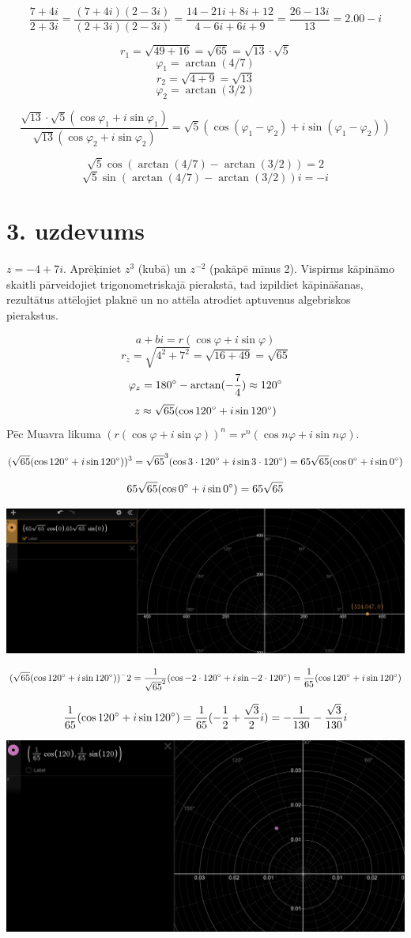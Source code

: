 \documentclass{article}
\begin{document}
$$\frac{7+4i}{2+3i} = \frac{(7+4i)(2-3i)}{(2+3i)(2-3i)} = \frac{14-21i+8i+12}{4-6i+6i+9} = \frac{26-13i}{13} = 2.00-i$$

$$r_1 = \sqrt{49+16} = \sqrt{65}=\sqrt{13}\cdot\sqrt{5}$$
$$\varphi_1 = \arctan{(4/7)}$$
$$r_2 = \sqrt{4+9} = \sqrt{13}$$
$$\varphi_2 = \arctan{(3/2)}$$

$$\frac{\sqrt{13}\cdot\sqrt{5}(\cos\varphi_1+i\sin\varphi_1)}{\sqrt{13}(\cos\varphi_2+i\sin\varphi_2)} = \sqrt{5}(\cos(\varphi_1-\varphi_2)+i\sin(\varphi_1-\varphi_2))$$

$$\sqrt{5}\cos(\arctan(4/7)-\arctan(3/2)) = 2$$
$$\sqrt{5}\sin(\arctan(4/7)-\arctan(3/2))i = -i$$

\section*{3. uzdevums}
$z=-4+7i$. Aprēķiniet $z^3$ (kubā) un $z^{-2}$ (pakāpē mīnus 2). Vispirms kāpināmo skaitli pārveidojiet trigonometriskajā pierakstā, tad izpildiet kāpināšanas, rezultātus attēlojiet plaknē un no attēla atrodiet aptuvenus algebriskos pierakstus.

$$a+bi = r(\cos\varphi+i\sin\varphi)$$
$$ r_z = \sqrt{4^2+7^2} =  \sqrt{16+49} = \sqrt{65}$$
$$ \varphi_z = 180\degree - \arctan(-\frac{7}{4}) \approx 120\degree$$
$$z \approx\sqrt{65}(\cos120\degree+i\sin120\degree)$$
Pēc Muavra likuma $(r(\cos \varphi + i \sin \varphi))^n=r^n(\cos n\varphi + i \sin n\varphi)$.

$$(\sqrt{65}(\cos120\degree+i\sin120\degree))^3 = \sqrt{65}^3(\cos3\cdot120\degree+i\sin3\cdot120\degree)= 65\sqrt{65}(\cos0\degree + i\sin0\degree)$$

$$65\sqrt{65}(\cos0\degree + i\sin0\degree)=65\sqrt{65}$$

\includegraphics[width=\textwidth]{2}

$$(\sqrt{65}(\cos120\degree+i\sin120\degree))^-2 = \frac{1}{\sqrt{65}^2}(\cos-2\cdot120\degree+i\sin-2\cdot120\degree)= \frac{1}{65}(\cos120\degree + i\sin120\degree)$$

$$\frac{1}{65}(\cos120\degree + i\sin120\degree)=\frac{1}{65}(-\frac{1}{2}+\frac{\sqrt{3}}{2}i) = -\frac{1}{130}-\frac{\sqrt{3}}{130}i$$

\includegraphics[width=\textwidth]{3}
\end{document}
